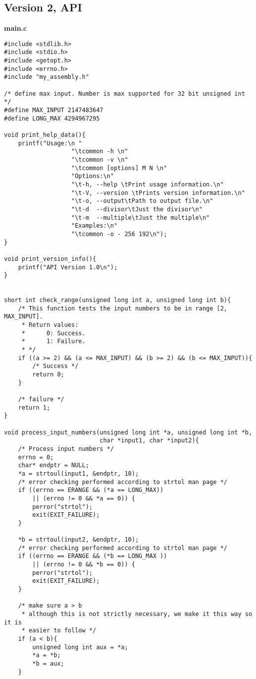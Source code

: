\documentclass[a4paper,10pt]{article}
\begin{document}
\subsection{Version 2, API}

\textbf{main.c}
\begin{lstlisting}[style=customc]
#include <stdlib.h>
#include <stdio.h>
#include <getopt.h>
#include <errno.h>
#include "my_assembly.h"

/* define max input. Number is max supported for 32 bit unsigned int */
#define MAX_INPUT 2147483647
#define LONG_MAX 4294967295

void print_help_data(){
    printf("Usage:\n "
                   "\tcommon -h \n"
                   "\tcommon -v \n"
                   "\tcommon [options] M N \n"
                   "Options:\n"
                   "\t-h, --help \tPrint usage information.\n"
                   "\t-V, --version \tPrints version information.\n"
                   "\t-o, --output\tPath to output file.\n"
                   "\t-d  --divisor\tJust the divisor\n"
                   "\t-m  --multiple\tJust the multiple\n"
                   "Examples:\n"
                   "\tcommon -o - 256 192\n");
}

void print_version_info(){
    printf("API Version 1.0\n");
}


short int check_range(unsigned long int a, unsigned long int b){
    /* This function tests the input numbers to be in range [2, MAX_INPUT].
     * Return values:
     *      0: Success.
     *      1: Failure.
     * */
    if ((a >= 2) && (a <= MAX_INPUT) && (b >= 2) && (b <= MAX_INPUT)){
        /* Success */
        return 0;
    }

    /* failure */
    return 1;
}

void process_input_numbers(unsigned long int *a, unsigned long int *b,
                           char *input1, char *input2){
    /* Process input numbers */
    errno = 0;
    char* endptr = NULL;
    *a = strtoul(input1, &endptr, 10);
    /* error checking performed according to strtol man page */
    if ((errno == ERANGE && (*a == LONG_MAX))
        || (errno != 0 && *a == 0)) {
        perror("strtol");
        exit(EXIT_FAILURE);
    }

    *b = strtoul(input2, &endptr, 10);
    /* error checking performed according to strtol man page */
    if ((errno == ERANGE && (*b == LONG_MAX ))
        || (errno != 0 && *b == 0)) {
        perror("strtol");
        exit(EXIT_FAILURE);
    }

    /* make sure a > b
     * although this is not strictly necessary, we make it this way so it is
     * easier to follow */
    if (a < b){
        unsigned long int aux = *a;
        *a = *b;
        *b = aux;
    }


\end{lstlisting}
\end{document}
